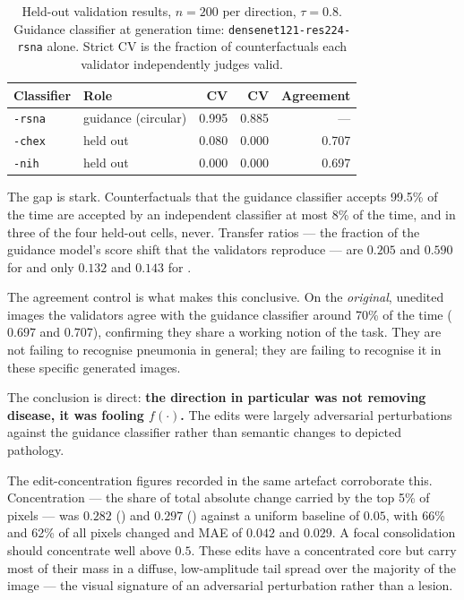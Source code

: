 \begin{table}[h]
\centering
\caption[Held-out validation results]{Held-out validation results,
$n=200$ per direction, $\tau=0.8$. Guidance classifier at generation time:
\texttt{densenet121-res224-rsna} alone. Strict CV is the fraction of
counterfactuals each validator independently judges valid.}
\label{tab:heldout}
\begin{tabular}{@{}llrrr@{}}
\toprule
\textbf{Classifier} & \textbf{Role} & \textbf{CV \ntop{}} & \textbf{CV \pton{}} & \textbf{Agreement} \\
\midrule
\texttt{-rsna}  & guidance (circular) & 0.995 & 0.885 & --- \\
\texttt{-chex}  & held out            & 0.080 & 0.000 & 0.707 \\
\texttt{-nih}   & held out            & 0.000 & 0.000 & 0.697 \\
\bottomrule
\end{tabular}
\end{table}

The gap is stark. Counterfactuals that the guidance classifier accepts
99.5\% of the time are accepted by an independent classifier at most 8\%
of the time, and in three of the four held-out cells, never. Transfer
ratios --- the fraction of the guidance model's score shift that the
validators reproduce --- are $0.205$ and $0.590$ for \ntop{} and only
$0.132$ and $0.143$ for \pton{}.

The agreement control is what makes this conclusive. On the
\emph{original}, unedited images the validators agree with the guidance
classifier around 70\% of the time ($0.697$ and $0.707$), confirming they
share a working notion of the task. They are not failing to recognise
pneumonia in general; they are failing to recognise it in these specific
generated images.

The conclusion is direct: \textbf{the \pton{} direction in particular was
not removing disease, it was fooling $f(\cdot)$.} The edits were largely
adversarial perturbations against the guidance classifier rather than
semantic changes to depicted pathology.

The edit-concentration figures recorded in the same artefact corroborate
this. Concentration --- the share of total absolute change carried by the
top 5\% of pixels --- was $0.282$ (\ntop{}) and $0.297$ (\pton{}) against
a uniform baseline of $0.05$, with 66\% and 62\% of all pixels changed
and MAE of $0.042$ and $0.029$. A focal consolidation should concentrate
well above $0.5$. These edits have a concentrated core but carry most of
their mass in a diffuse, low-amplitude tail spread over the majority of
the image --- the visual signature of an adversarial perturbation rather
than a lesion.

